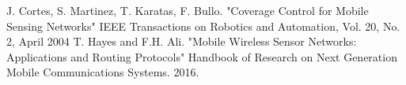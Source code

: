 \documentclass[a4paper,11pt,oneside]{book}
\begin{document}
	\begin{thebibliography}{9}             %
		
		
		
		 J. Cortes, S. Martinez, T. Karatas, F. Bullo. "Coverage Control for Mobile Sensing Networks"
		IEEE Transactions on Robotics and Automation, Vol. 20, No. 2, April 2004
		 T. Hayes and F.H. Ali. "Mobile Wireless Sensor Networks: Applications and Routing Protocols" Handbook of Research on Next Generation Mobile Communications Systems. 2016.
		
	\end{thebibliography}
	
	
\end{document}
